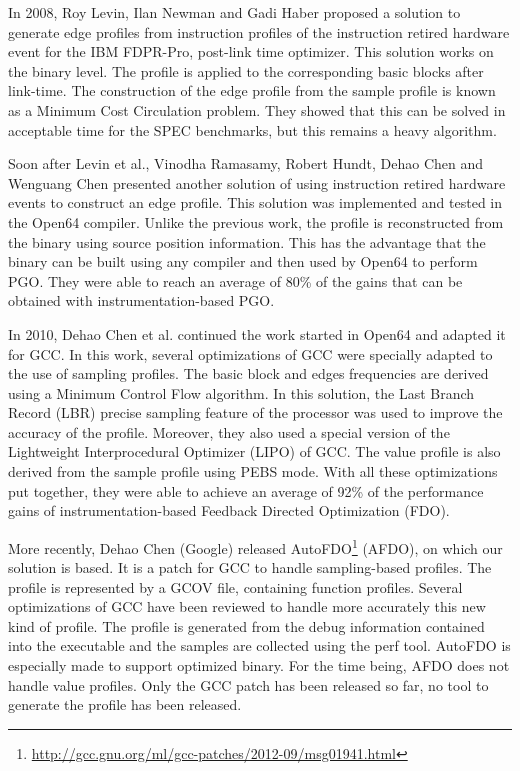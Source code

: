 \documentclass[9pt,english,twocolumn,letter]{article}
\begin{document}
In 2008, Roy Levin, Ilan Newman and Gadi Haber \cite{Levin2008} proposed a solution to generate edge profiles from instruction profiles of the instruction retired hardware event for the IBM FDPR-Pro, post-link time optimizer. This solution works on the binary level. The profile is applied to the corresponding basic blocks after link-time.  The construction of the edge profile from the sample profile is known as a Minimum Cost Circulation problem. They showed that this can be solved in acceptable time for the SPEC benchmarks, but this remains a heavy algorithm.

Soon after Levin et al., Vinodha Ramasamy, Robert Hundt, Dehao Chen and Wenguang Chen \cite{Ramasamy2008} presented another solution of using instruction retired hardware events to construct an edge profile. This solution was implemented and tested in the Open64 compiler. Unlike the previous work, the profile is reconstructed from the binary using source position information. This has the advantage that the binary can be built using any compiler and then used by Open64 to perform PGO.  They were able to reach an average of 80\% of the gains that can be obtained with instrumentation-based PGO.

In 2010, Dehao Chen et al. \cite{Chen2010} continued the work started in Open64 and adapted it for GCC. In this work, several optimizations of GCC were specially adapted to the use of sampling profiles. The basic block and edges frequencies are derived using a Minimum Control Flow algorithm. In this solution, the Last Branch Record (LBR) precise sampling feature of the processor was used to improve the accuracy of the profile. Moreover, they also used a special version of the Lightweight Interprocedural Optimizer (LIPO) of GCC. The value profile is also derived from the sample profile using PEBS mode. With all these optimizations put together, they were able to achieve an average of 92\% of the performance gains of instrumentation-based Feedback Directed Optimization (FDO).

More recently, Dehao Chen (Google) released AutoFDO\footnote{\url{http://gcc.gnu.org/ml/gcc-patches/2012-09/msg01941.html}} (AFDO), on which our solution is based. It is a patch for GCC to handle sampling-based profiles. The profile is represented by a GCOV file, containing function profiles. Several optimizations of GCC have been reviewed to handle more accurately this new kind of profile. The profile is generated from the debug information contained into the executable and the samples are collected using the perf tool. AutoFDO is especially made to support optimized binary. For the time being, AFDO does not handle value profiles. Only the GCC patch has been released so far, no tool to generate the profile has been released.
\end{document}
